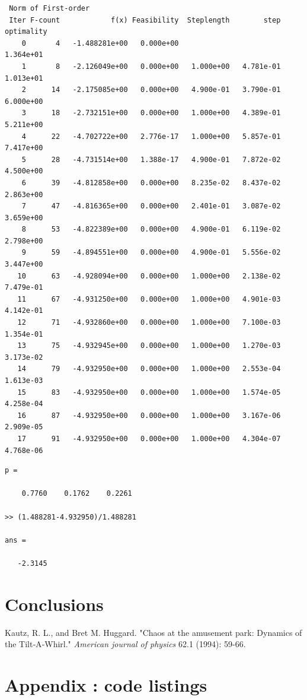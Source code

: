\documentclass[11pt]{article}
\begin{document}
\begin{verbatim}
 Norm of First-order
 Iter F-count            f(x) Feasibility  Steplength        step  optimality
    0       4   -1.488281e+00   0.000e+00                           1.364e+01
    1       8   -2.126049e+00   0.000e+00   1.000e+00   4.781e-01   1.013e+01
    2      14   -2.175085e+00   0.000e+00   4.900e-01   3.790e-01   6.000e+00
    3      18   -2.732151e+00   0.000e+00   1.000e+00   4.389e-01   5.211e+00
    4      22   -4.702722e+00   2.776e-17   1.000e+00   5.857e-01   7.417e+00
    5      28   -4.731514e+00   1.388e-17   4.900e-01   7.872e-02   4.500e+00
    6      39   -4.812858e+00   0.000e+00   8.235e-02   8.437e-02   2.863e+00
    7      47   -4.816365e+00   0.000e+00   2.401e-01   3.087e-02   3.659e+00
    8      53   -4.822389e+00   0.000e+00   4.900e-01   6.119e-02   2.798e+00
    9      59   -4.894551e+00   0.000e+00   4.900e-01   5.556e-02   3.447e+00
   10      63   -4.928094e+00   0.000e+00   1.000e+00   2.138e-02   7.479e-01
   11      67   -4.931250e+00   0.000e+00   1.000e+00   4.901e-03   4.142e-01
   12      71   -4.932860e+00   0.000e+00   1.000e+00   7.100e-03   1.354e-01
   13      75   -4.932945e+00   0.000e+00   1.000e+00   1.270e-03   3.173e-02
   14      79   -4.932950e+00   0.000e+00   1.000e+00   2.553e-04   1.613e-03
   15      83   -4.932950e+00   0.000e+00   1.000e+00   1.574e-05   4.258e-04
   16      87   -4.932950e+00   0.000e+00   1.000e+00   3.167e-06   2.909e-05
   17      91   -4.932950e+00   0.000e+00   1.000e+00   4.304e-07   4.768e-06
\end{verbatim}

\begin{verbatim}
p =

    0.7760    0.1762    0.2261

>> (1.488281-4.932950)/1.488281

ans =

   -2.3145
\end{verbatim}

\section{Conclusions}

\begin{thebibliography}{1}
 Kautz, R. L., and Bret M. Huggard.
"Chaos at the amusement park: Dynamics of the Tilt‐A‐Whirl."
\emph{American journal of physics} 62.1 (1994): 59-66.
\end{thebibliography}

\newpage

\section{Appendix : code listings}


\newpage

\newpage

\newpage

\end{document}
